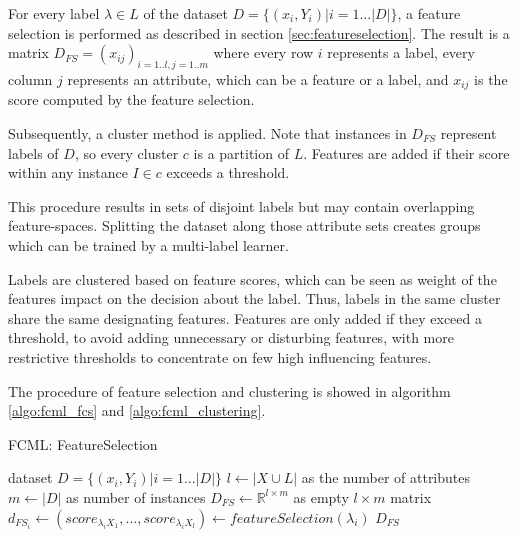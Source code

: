 		For every label $ \lambda \in L $ of the dataset \mbox{$ D= \{(x_i,Y_i) | i=1...|D|\} $}, a feature selection is performed as described in section \ref{sec:featureselection}. The result is a matrix $ D_{FS}=(x_{ij})_{i=1..l,j=1..m} $ where every row $ i $ represents a label, every column $ j $ represents an attribute, which can be a feature or a label, and $ x_{ij} $ is the score computed by the feature selection. 

		Subsequently, a cluster method is applied. Note that instances in $ D_{FS} $ represent labels of $ D $, so every cluster $c$ is a partition of $ L $. Features are added if their score within any instance $I \in c$ exceeds a threshold. 

		This procedure results in sets of disjoint labels but may contain overlapping feature-spaces. Splitting the dataset along those attribute sets creates groups which can be trained by a multi-label learner.
		
		Labels are clustered based on feature scores, which can be seen as weight of the features impact on the decision about the label. Thus, labels in the same cluster share the same designating features. Features are only added if they exceed a threshold, to avoid adding unnecessary or disturbing features, with more restrictive thresholds to concentrate on few high influencing features.
		
		The procedure of feature selection and clustering is showed in algorithm \ref{algo:fcml_fcs} and \ref{algo:fcml_clustering}.

		\begin{algorithm}
			\caption{FCML: FeatureSelection} 
			\label{algo:fcml_fcs}
			\begin{algorithmic}
			\REQUIRE dataset $ D= \{(x_i,Y_i) | i=1...|D|\} $			
			\STATE $ l \gets |X\cup L| $ as the number of attributes
			\STATE $ m \gets |D| $ as number of instances
			\STATE $ D_{FS} \gets \mathbb R^{l\times m} $ as empty $l\times m$ matrix
				\STATE $ d_{{FS}_i} \gets (score_{\lambda_iX_1},...,score_{\lambda_iX_l}) \gets 		featureSelection(\lambda_i) $ 
			\ENDFOR
			\RETURN $ D_{FS} $
			\end{algorithmic}
		\end{algorithm}

